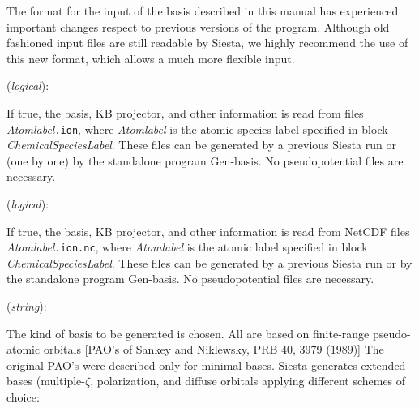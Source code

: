 \documentclass[11pt]{article}
\begin{document}
\noindent 
The format for the input of the basis described in this manual
has experienced important changes respect to 
previous versions of the program. Although old fashioned 
input files are
still readable by {\sc Siesta}, we highly recommend the use of this
new format, which allows a much more flexible input.

\begin{description}
\itemsep 10pt
\parsep 0pt
\item[{\bf User.Basis}] ({\it logical}): 

If true, the basis, KB projector, and other information is read from
files {\it Atomlabel}{\tt .ion}, where {\it Atomlabel} is the atomic
species label specified in block {\it ChemicalSpeciesLabel}. These
files can be generated by a previous {\sc Siesta} run or (one by one) by the
standalone program {\sc Gen-basis}. No pseudopotential
files are necessary.

\item[{\bf User.Basis.NetCDF}] ({\it logical}): 

If true, the basis, KB projector, and other information is read from
NetCDF files {\it Atomlabel}{\tt .ion.nc}, where {\it Atomlabel} is
the atomic label specified in block {\it ChemicalSpeciesLabel}. These
files can be generated by a previous {\sc Siesta} run or by the
standalone program {\sc Gen-basis}. No pseudopotential
files are necessary.


\item[{\bf PAO.BasisType}] ({\it string}): 

The kind of basis to be generated is chosen. All are based on
finite-range pseudo-atomic orbitals [PAO's of Sankey and Niklewsky, PRB 40, 3979 (1989)] The
original PAO's were described only for minimal bases. {\sc Siesta}
generates extended bases (multiple-$\zeta$,
polarization, and diffuse
orbitals applying different schemes of choice:

\begin{itemize}


\end{itemize}
\end{description}
\end{document}
